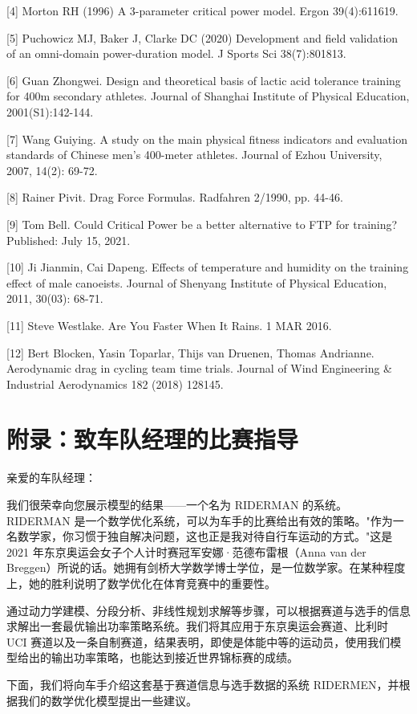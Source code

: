 \documentclass[11pt,a4paper]{ctexart}
\begin{document}
[4] Morton RH (1996) A 3-parameter critical power model. Ergon 39(4):611619.

[5] Puchowicz MJ, Baker J, Clarke DC (2020) Development and field validation of an omni-domain power-duration model. J Sports Sci 38(7):801813.

[6] Guan Zhongwei. Design and theoretical basis of lactic acid tolerance training for 400m secondary athletes. Journal of Shanghai Institute of Physical Education, 2001(S1):142-144.

[7] Wang Guiying. A study on the main physical fitness indicators and evaluation standards of Chinese men's 400-meter athletes. Journal of Ezhou University, 2007, 14(2): 69-72.

[8] Rainer Pivit. Drag Force Formulas. Radfahren 2/1990, pp. 44-46.

[9] Tom Bell. Could Critical Power be a better alternative to FTP for training? Published: July 15, 2021.

[10] Ji Jianmin, Cai Dapeng. Effects of temperature and humidity on the training effect of male canoeists. Journal of Shenyang Institute of Physical Education, 2011, 30(03): 68-71.

[11] Steve Westlake. Are You Faster When It Rains. 1 MAR 2016.

[12] Bert Blocken, Yasin Toparlar, Thijs van Druenen, Thomas Andrianne. Aerodynamic drag in cycling team time trials. Journal of Wind Engineering \& Industrial Aerodynamics 182 (2018) 128145.

\section*{附录：致车队经理的比赛指导}

亲爱的车队经理：

我们很荣幸向您展示模型的结果——一个名为 RIDERMAN 的系统。RIDERMAN 是一个数学优化系统，可以为车手的比赛给出有效的策略。"作为一名数学家，你习惯于独自解决问题，这也正是我对待自行车运动的方式。"这是 2021 年东京奥运会女子个人计时赛冠军安娜·范德布雷根（Anna van der Breggen）所说的话。她拥有剑桥大学数学博士学位，是一位数学家。在某种程度上，她的胜利说明了数学优化在体育竞赛中的重要性。

通过动力学建模、分段分析、非线性规划求解等步骤，可以根据赛道与选手的信息求解出一套最优输出功率策略系统。我们将其应用于东京奥运会赛道、比利时 UCI 赛道以及一条自制赛道，结果表明，即使是体能中等的运动员，使用我们模型给出的输出功率策略，也能达到接近世界锦标赛的成绩。

下面，我们将向车手介绍这套基于赛道信息与选手数据的系统 RIDERMEN，并根据我们的数学优化模型提出一些建议。
\end{document}
